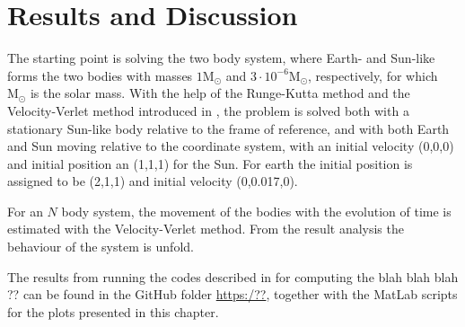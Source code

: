 \chapter{Results and Discussion}
\label{chap:Results}
The starting point is solving the two body system, where Earth- and Sun-like forms the two bodies with masses $1\textrm{M}_{\odot}$ and $3\cdot 10^{-6} \textrm{M}_{\odot}$, respectively, for which $\textrm{M}_{\odot}$ is the solar mass. 
With the help of the Runge-Kutta method and the Velocity-Verlet method introduced in , the problem is solved both with a stationary Sun-like body relative to the frame of reference, and with both Earth and Sun moving relative to the coordinate system, with an initial velocity (0,0,0) and initial position an (1,1,1) for the Sun. 
For earth the initial position is assigned to be (2,1,1) and initial velocity (0,0.017,0). 

For an $N$ body system, the movement of the bodies with the evolution of time is estimated with the Velocity-Verlet method. 
From the result analysis the behaviour of the system is unfold.

The results from running the codes described in  for computing the blah blah blah ?? can be found in the GitHub folder  \url{https:/??}, together with the MatLab scripts for the plots presented in this chapter. 
